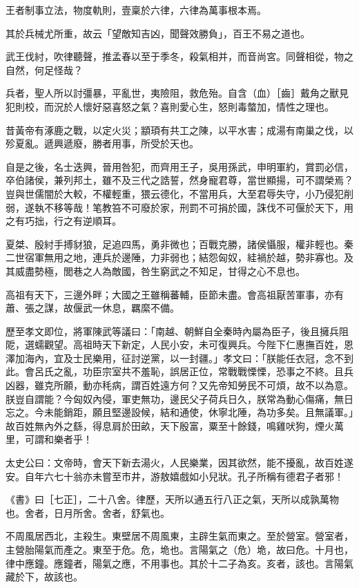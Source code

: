 
\begin{pinyinscope}
王者制事立法，物度軌則，壹稟於六律，六律為萬事根本焉。

其於兵械尤所重，故云「望敵知吉凶，聞聲效勝負」，百王不易之道也。

武王伐紂，吹律聽聲，推孟春以至于季冬，殺氣相并，而音尚宮。同聲相從，物之自然，何足怪哉？

兵者，聖人所以討彊暴，平亂世，夷險阻，救危殆。自含（血）［齒］戴角之獸見犯則校，而況於人懷好惡喜怒之氣？喜則愛心生，怒則毒螫加，情性之理也。

昔黃帝有涿鹿之戰，以定火災；顓頊有共工之陳，以平水害；成湯有南巢之伐，以殄夏亂。遞興遞廢，勝者用事，所受於天也。

自是之後，名士迭興，晉用咎犯，而齊用王子，吳用孫武，申明軍約，賞罰必信，卒伯諸侯，兼列邦土，雖不及三代之誥誓，然身寵君尊，當世顯揚，可不謂榮焉？豈與世儒闇於大較，不權輕重，猥云德化，不當用兵，大至君辱失守，小乃侵犯削弱，遂執不移等哉！笔教笞不可廢於家，刑罰不可捐於國，誅伐不可偃於天下，用之有巧拙，行之有逆順耳。

夏桀、殷紂手搏豺狼，足追四馬，勇非微也；百戰克勝，諸侯懾服，權非輕也。秦二世宿軍無用之地，連兵於邊陲，力非弱也；結怨匈奴，絓禍於越，勢非寡也。及其威盡勢極，閭巷之人為敵國，咎生窮武之不知足，甘得之心不息也。

高祖有天下，三邊外畔；大國之王雖稱蕃輔，臣節未盡。會高祖厭苦軍事，亦有蕭、張之謀，故偃武一休息，羈縻不備。

歷至孝文即位，將軍陳武等議曰：「南越、朝鮮自全秦時內屬為臣子，後且擁兵阻阸，選蠕觀望。高祖時天下新定，人民小安，未可復興兵。今陛下仁惠撫百姓，恩澤加海內，宜及士民樂用，征討逆黨，以一封疆。」孝文曰：「朕能任衣冠，念不到此。會呂氏之亂，功臣宗室共不羞恥，誤居正位，常戰戰慄慄，恐事之不終。且兵凶器，雖克所願，動亦秏病，謂百姓遠方何？又先帝知勞民不可煩，故不以為意。朕豈自謂能？今匈奴內侵，軍吏無功，邊民父子荷兵日久，朕常為動心傷痛，無日忘之。今未能銷距，願且堅邊設候，結和通使，休寧北陲，為功多矣。且無議軍。」故百姓無內外之繇，得息肩於田畝，天下殷富，粟至十餘錢，鳴雞吠狗，煙火萬里，可謂和樂者乎！

太史公曰：文帝時，會天下新去湯火，人民樂業，因其欲然，能不擾亂，故百姓遂安。自年六七十翁亦未嘗至市井，游敖嬉戲如小兒狀。孔子所稱有德君子者邪！

《書》曰［七正］，二十八舍。律歷，天所以通五行八正之氣，天所以成孰萬物也。舍者，日月所舍。舍者，舒氣也。

不周風居西北，主殺生。東壁居不周風東，主辟生氣而東之。至於營室。營室者，主營胎陽氣而產之。東至于危。危，垝也。言陽氣之（危）垝，故曰危。十月也，律中應鐘。應鐘者，陽氣之應，不用事也。其於十二子為亥。亥者，該也。言陽氣藏於下，故該也。


\end{pinyinscope}
